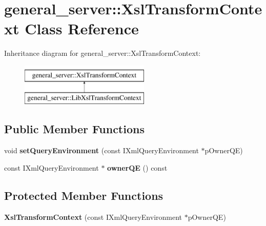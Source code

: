 \hypertarget{classgeneral__server_1_1XslTransformContext}{\section{general\-\_\-server\-:\-:\-Xsl\-Transform\-Context \-Class \-Reference}
\label{classgeneral__server_1_1XslTransformContext}
}
\-Inheritance diagram for general\-\_\-server\-:\-:\-Xsl\-Transform\-Context\-:\begin{figure}[H]
\begin{center}
\leavevmode
\includegraphics[height=2.000000cm]{classgeneral__server_1_1XslTransformContext}
\end{center}
\end{figure}
\subsection*{\-Public \-Member \-Functions}
\begin{DoxyCompactItemize}
\item 
\hypertarget{classgeneral__server_1_1XslTransformContext_a2ec3c6666da9b04ba0154c3c55c733c3}{void {\bfseries set\-Query\-Environment} (const \-I\-Xml\-Query\-Environment $\ast$p\-Owner\-Q\-E)}\label{classgeneral__server_1_1XslTransformContext_a2ec3c6666da9b04ba0154c3c55c733c3}

\item 
\hypertarget{classgeneral__server_1_1XslTransformContext_a6be75135f0a0e452ef74985c768a174a}{const \-I\-Xml\-Query\-Environment $\ast$ {\bfseries owner\-Q\-E} () const }\label{classgeneral__server_1_1XslTransformContext_a6be75135f0a0e452ef74985c768a174a}

\end{DoxyCompactItemize}
\subsection*{\-Protected \-Member \-Functions}
\begin{DoxyCompactItemize}
\item 
\hypertarget{classgeneral__server_1_1XslTransformContext_a36ee0ee65f1b31279d510d80f675db51}{{\bfseries \-Xsl\-Transform\-Context} (const \-I\-Xml\-Query\-Environment $\ast$p\-Owner\-Q\-E)}\label{classgeneral__server_1_1XslTransformContext_a36ee0ee65f1b31279d510d80f675db51}

\end{DoxyCompactItemize}
